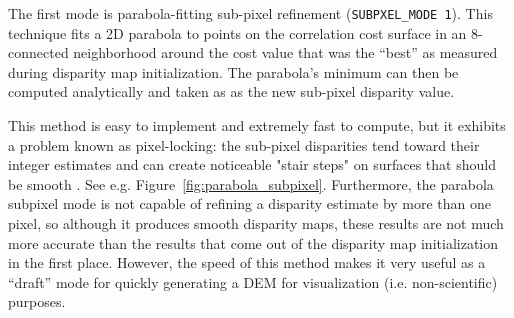 The first mode is parabola-fitting sub-pixel refinement
(\texttt{SUBPXEL\_MODE 1}).  This technique fits a 2D parabola to
points on the correlation cost surface in an 8-connected neighborhood
around the cost value that was the ``best'' as measured during
disparity map initialization. The parabola's minimum can then be
computed analytically and taken as as the new sub-pixel disparity
value.

This method is easy to implement and extremely fast to compute, but it
exhibits a problem known as pixel-locking: the sub-pixel disparities
tend toward their integer estimates and can create noticeable "stair
steps" on surfaces that should be
smooth \citep{Stein06:attenuating,Szeliski03sampling}.  See
e.g. Figure~\ref{fig:parabola_subpixel}. Furthermore, the parabola
subpixel mode is not capable of refining a disparity estimate by more
than one pixel, so although it produces smooth disparity maps, these
results are not much more accurate than the results that come out of
the disparity map initialization in the first place.  However, the
speed of this method makes it very useful as a ``draft'' mode for
quickly generating a \ac{DEM} for visualization (i.e. non-scientific)
purposes.

